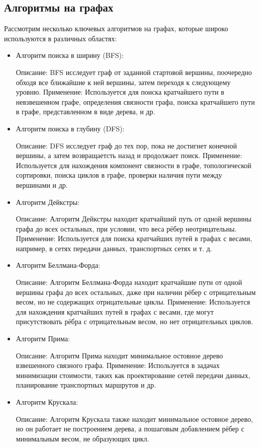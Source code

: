 \subsection{Алгоритмы на графах}

Рассмотрим несколько ключевых алгоритмов на графах, которые широко используются в различных областях:

\begin{itemize}
	\item Алгоритм поиска в ширину (BFS):

	Описание: BFS исследует граф от заданной стартовой вершины, поочередно обходя все ближайшие к ней вершины, затем переходя к следующему уровню.
	Применение: Используется для поиска кратчайшего пути в невзвешенном графе, определения связности графа, поиска кратчайшего пути в графе, представленном в виде дерева, и др.
	
	\item Алгоритм поиска в глубину (DFS):
	
	Описание: DFS исследует граф до тех пор, пока не достигнет конечной вершины, а затем возвращаетсть назад и продолжает поиск.
	Применение: Используется для нахождения компонент связности в графе, топологической сортировки, поиска циклов в графе, проверки наличия пути между вершинами и др.
	
	\item Алгоритм Дейкстры:
	
	Описание: Алгоритм Дейкстры находит кратчайший путь от одной вершины графа до всех остальных, при условии, что веса рёбер неотрицательны.
	Применение: Используется для поиска кратчайших путей в графах с весами, например, в сетях передачи данных, транспортных сетях и т. д.
	
	\item Алгоритм Беллмана-Форда:
	
	Описание: Алгоритм Беллмана-Форда находит кратчайшие пути от одной вершины графа до всех остальных, даже при наличии рёбер с отрицательным весом, но не содержащих отрицательные циклы.
	Применение: Используется для нахождения кратчайших путей в графах с весами, где могут присутствовать рёбра с отрицательным весом, но нет отрицательных циклов.
	
	\item Алгоритм Прима:
	
	Описание: Алгоритм Прима находит минимальное остовное дерево взвешенного связного графа.
	Применение: Используется в задачах минимизации стоимости, таких как проектирование сетей передачи данных, планирование транспортных маршрутов и др.
	
	\item Алгоритм Крускала:
	
	Описание: Алгоритм Крускала также находит минимальное остовное дерево, но он работает не построением дерева, а пошаговым добавлением рёбер с минимальным весом, не образующих цикл.
\end{itemize}

